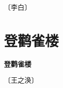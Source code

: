 \documentclass[12pt,UTF-8,openany,fontset=none]{ctexbook}
\begin{document}
\begin{center}
    \vspace{10pt}
    
    \begin{large}
        
        〔李白〕
        
    \end{large}
    
    \vspace{8pt}
    
    \begin{huge}
        
        \phantom{。}

        \phantom{。}
        
        \phantom{。}

        \phantom{。}
        
    \end{huge}
    
\end{center}

\vspace{8pt}
\clearpage


\section{登鹳雀楼}



\begin{center}
    {\bfseries 登鹳雀楼}
\end{center}

\begin{center}
    \vspace{10pt}
    
    \begin{large}
        
        〔王之涣〕
        
    \end{large}
    
    \vspace{8pt}
    
    \begin{huge}
        
        \phantom{。}

        \phantom{。}
        
        \phantom{。}

        \phantom{。}
        
    \end{huge}
    
\end{center}
\end{document}
